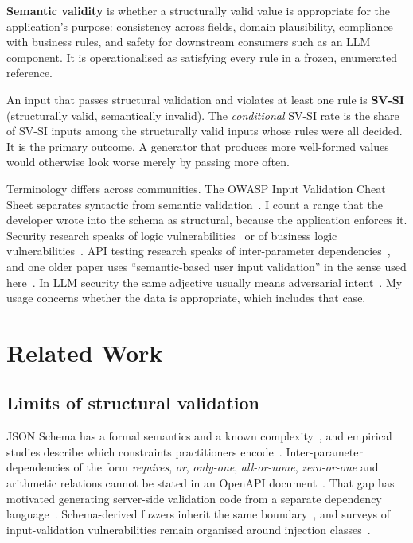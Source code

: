\documentclass[conference]{IEEEtran}
\begin{document}
\textbf{Semantic validity} is whether a structurally valid value is appropriate for the application's
purpose: consistency across fields, domain plausibility, compliance with business rules, and safety
for downstream consumers such as an LLM component. It is operationalised as satisfying every rule in a
frozen, enumerated reference.

An input that passes structural validation and violates at least one rule is \textbf{SV-SI}
(structurally valid, semantically invalid). The \emph{conditional} SV-SI rate is the share of SV-SI
inputs among the structurally valid inputs whose rules were all decided. It is the primary outcome. A
generator that produces more well-formed values would otherwise look worse merely by passing more
often.

Terminology differs across communities. The OWASP Input Validation Cheat Sheet separates syntactic from
semantic validation~\cite{owasp2026inputvalidation}. I count a range that the developer wrote into the
schema as structural, because the application enforces it. Security research speaks of logic
vulnerabilities~\cite{felmetsger2010waler,pellegrino2014logicflaws} or of business logic
vulnerabilities~\cite{metin2025blv}. API testing research speaks of inter-parameter
dependencies~\cite{martinlopez2022idl,martinlopez2019catalogue}, and one older paper uses
``semantic-based user input validation'' in the sense used here~\cite{hanna2018semanticvalidation}. In LLM
security the same adjective usually means adversarial intent~\cite{singh2026injectioninteraction}. My
usage concerns whether the data is appropriate, which includes that case.

\section{Related Work}
\label{sec:related}

\subsection{Limits of structural validation}
JSON Schema has a formal semantics and a known complexity~\cite{pezoa2016foundations,attouche2023jsonschema},
and empirical studies describe which constraints practitioners encode~\cite{baazizi2021usagenot}.
Inter-parameter dependencies of the form \emph{requires}, \emph{or}, \emph{only-one},
\emph{all-or-none}, \emph{zero-or-one} and arithmetic relations cannot be stated in an OpenAPI
document~\cite{martinlopez2022idl,martinlopez2019catalogue}. That gap has motivated generating
server-side validation code from a separate dependency language~\cite{barakat2023idlgen}.
Schema-derived fuzzers inherit the same boundary~\cite{hatfielddodds2021schemathesis}, and surveys of
input-validation vulnerabilities remain organised around injection
classes~\cite{fadlalla2023inputvalidation}.
\end{document}
